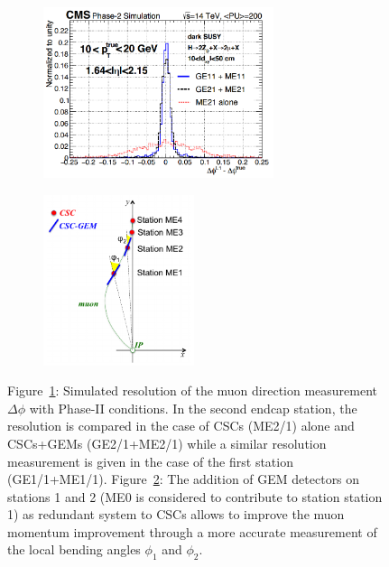 	\begin{figure}[H]
		\begin{subfigure}{0.6\linewidth}
			\centering
			\includegraphics[height=5cm]{fig/chapt3/GEM-muon-direction.png}
			\caption{\label{fig:GEM-Muon:A}}
		\end{subfigure}
		\begin{subfigure}{0.4\linewidth}
			\centering
			\includegraphics[height=5cm]{fig/chapt3/GEM-Muon-bending.png}
			\caption{\label{fig:GEM-Muon:B}}
		\end{subfigure}
		\caption{\label{fig:GEM-Muon} Figure~\ref{fig:GEM-Muon:A}: Simulated resolution of the muon direction measurement $\Delta\phi$ with Phase-II conditions. In the second endcap station, the resolution is compared in the case of CSCs (ME2/1) alone and CSCs+GEMs (GE2/1+ME2/1) while a similar resolution measurement is given in the case of the first station (GE1/1+ME1/1). Figure~\ref{fig:GEM-Muon:B}: The addition of GEM detectors on stations 1 and 2 (ME0 is considered to contribute to station station 1) as redundant system to CSCs allows to improve the muon momentum improvement through a more accurate measurement of the local bending angles $\phi_1$ and $\phi_2$.}
	\end{figure}
	
